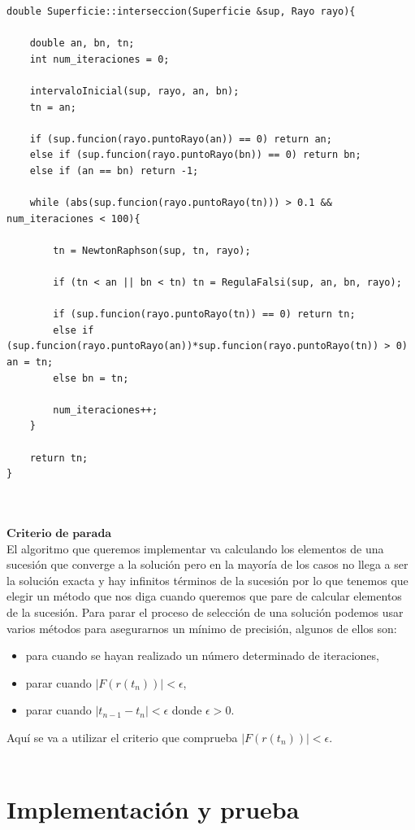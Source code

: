 \begin{lstlisting}[style=Consola]
double Superficie::interseccion(Superficie &sup, Rayo rayo){

	double an, bn, tn;
	int num_iteraciones = 0;

	intervaloInicial(sup, rayo, an, bn);
	tn = an;

	if (sup.funcion(rayo.puntoRayo(an)) == 0) return an;
	else if (sup.funcion(rayo.puntoRayo(bn)) == 0) return bn;
	else if (an == bn) return -1;

	while (abs(sup.funcion(rayo.puntoRayo(tn))) > 0.1 && num_iteraciones < 100){

		tn = NewtonRaphson(sup, tn, rayo);

		if (tn < an || bn < tn) tn = RegulaFalsi(sup, an, bn, rayo);

		if (sup.funcion(rayo.puntoRayo(tn)) == 0) return tn;
		else if (sup.funcion(rayo.puntoRayo(an))*sup.funcion(rayo.puntoRayo(tn)) > 0) an = tn;
		else bn = tn;

		num_iteraciones++;
	}

	return tn;
}
\end{lstlisting}
${ }$\\

${ }$\\
$\textbf{Criterio de parada}$
${ }$\\

El algoritmo que queremos implementar va calculando los elementos de una sucesión que converge a la solución pero en la mayoría de los casos no llega a ser la solución exacta y hay infinitos términos de la sucesión por lo que tenemos que elegir un método que nos diga cuando queremos que pare de calcular elementos de la sucesión. Para parar el proceso de selección de una solución podemos usar varios métodos para asegurarnos un mínimo de precisión, algunos de ellos son:
\begin{itemize}
	\item para cuando se hayan realizado un número determinado de iteraciones,
	\item parar cuando $|F(r(t_n))| < \epsilon$,
	\item parar cuando $|t_{n-1} - t_n| < \epsilon$ donde $\epsilon > 0$.
\end{itemize}
Aquí se va a utilizar el criterio que comprueba $|F(r(t_n))| < \epsilon$.
${ }$\\




${ }$\\
\section{Implementación y prueba}
${ }$\\

